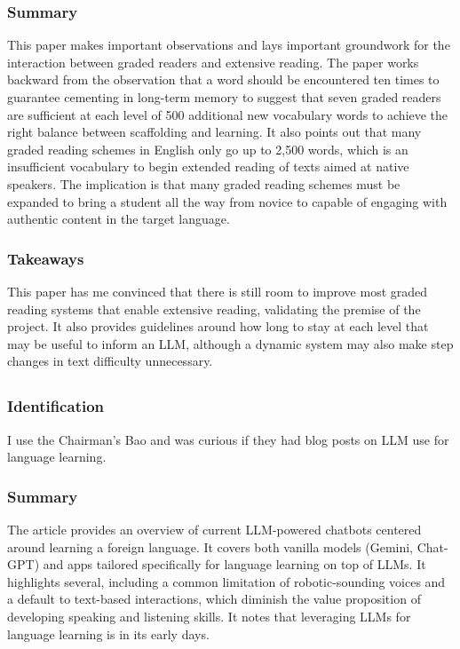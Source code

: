 \documentclass[
	letterpaper, %
]{jdf}
\begin{document}
\subsubsection{Summary}
This paper makes important observations and lays important groundwork for the interaction between graded readers and extensive reading. The paper works backward from the observation that a word should be encountered ten times to guarantee cementing in long-term memory to suggest that seven graded readers are sufficient at each level of 500 additional new vocabulary words to achieve the right balance between scaffolding and learning. It also points out that many graded reading schemes in English only go up to 2,500 words, which is an insufficient vocabulary to begin extended reading of texts aimed at native speakers. The implication is that many graded reading schemes must be expanded to bring a student all the way from novice to capable of engaging with authentic content in the target language.

\subsubsection{Takeaways}
This paper has me convinced that there is still room to improve most graded reading systems that enable extensive reading, validating the premise of the project. It also provides guidelines around how long to stay at each level that may be useful to inform an LLM, although a dynamic system may also make step changes in text difficulty unnecessary.

\subsection{}
\subsubsection{Identification}
I use the Chairman's Bao and was curious if they had blog posts on LLM use for language learning.

\subsubsection{Summary}
The article provides an overview of current LLM-powered chatbots centered around learning a foreign language. It covers both vanilla models (Gemini, Chat-GPT) and apps tailored specifically for language learning on top of LLMs. It highlights several, including a common limitation of robotic-sounding voices and a default to text-based interactions, which diminish the value proposition of developing speaking and listening skills. It notes that leveraging LLMs for language learning is in its early days.
\end{document}
